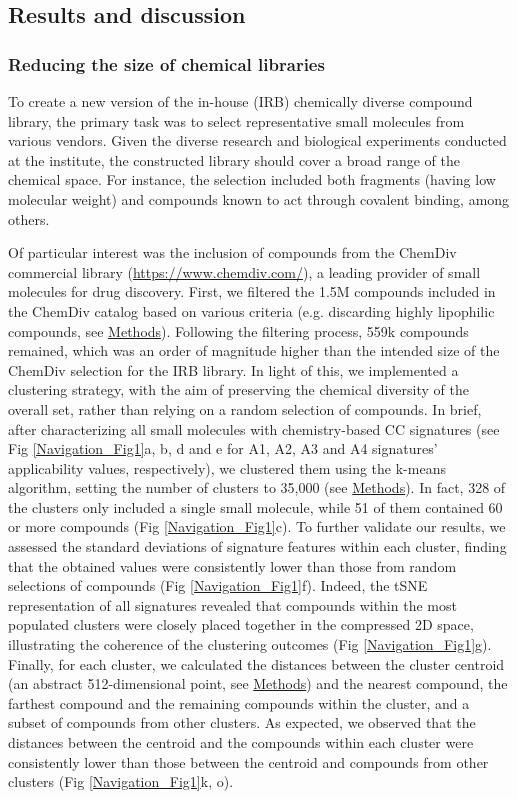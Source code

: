 \subsection{Results and discussion}

\subsubsection{Reducing the size of chemical libraries}

To create a new version of the in-house (IRB) chemically diverse compound library, the primary task was to select representative small molecules from various vendors. Given the diverse research and biological experiments conducted at the institute, the constructed library should cover a broad range of the chemical space. For instance, the selection included both fragments (having low molecular weight) and compounds known to act through covalent binding, among others. 

Of particular interest was the inclusion of compounds from the ChemDiv commercial library (\href{https://www.chemdiv.com/}{https://www.chemdiv.com/}), a leading provider of small molecules for drug discovery. First, we filtered the 1.5M compounds included in the ChemDiv catalog based on various criteria (e.g. discarding highly lipophilic compounds, see \hyperref[Navigation_Methods]{Methods}). Following the filtering process, 559k compounds remained, which was an order of magnitude higher than the intended size of the ChemDiv selection for the IRB library. In light of this, we implemented a clustering strategy, with the aim of preserving the chemical diversity of the overall set, rather than relying on a random selection of compounds. In brief, after characterizing all small molecules with chemistry-based CC signatures (see Fig \ref{Navigation_Fig1}a, b, d and e for A1, A2, A3 and A4 signatures’ applicability values, respectively), we clustered them using the k-means algorithm, setting the number of clusters to 35,000 (see \hyperref[Navigation_Methods]{Methods}). In fact, 328 of the clusters only included a single small molecule, while 51 of them contained 60 or more compounds (Fig \ref{Navigation_Fig1}c). To further validate our results, we assessed the standard deviations of signature features within each cluster, finding that the obtained values were consistently lower than those from random selections of compounds (Fig \ref{Navigation_Fig1}f). Indeed, the tSNE representation of all signatures revealed that compounds within the most populated clusters were closely placed together in the compressed 2D space, illustrating the coherence of the clustering outcomes (Fig \ref{Navigation_Fig1}g). Finally, for each cluster, we calculated the distances between the cluster centroid (an abstract 512-dimensional point, see \hyperref[Navigation_Methods]{Methods}) and the nearest compound, the farthest compound and the remaining compounds within the cluster, and a subset of compounds from other clusters. As expected, we observed that the distances between the centroid and the compounds within each cluster were consistently lower than those between the centroid and compounds from other clusters (Fig \ref{Navigation_Fig1}k, o). 

